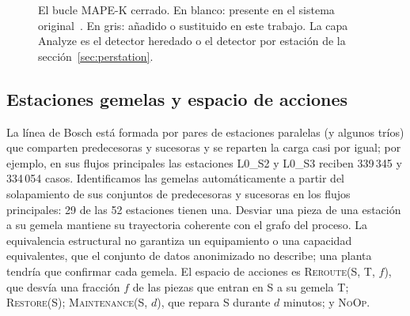 \documentclass[preprint,11pt]{elsarticle}
\begin{document}
\begin{figure}[t]
\centering
{}
\caption{El bucle MAPE-K cerrado. En blanco: presente en el sistema original~\cite{sanchez2020selfstar}. En gris: añadido o sustituido en este trabajo. La capa Analyze es el detector heredado o el detector por estación de la sección~\ref{sec:perstation}.}
\label{fig:loop}
\end{figure}

\subsection{Estaciones gemelas y espacio de acciones}
La línea de Bosch está formada por pares de estaciones paralelas (y algunos tríos) que comparten predecesoras y sucesoras y se reparten la carga casi por igual; por ejemplo, en sus flujos principales las estaciones L0\_S2 y L0\_S3 reciben 339\,345 y 334\,054 casos. Identificamos las gemelas automáticamente a partir del solapamiento de sus conjuntos de predecesoras y sucesoras en los flujos principales: 29 de las 52 estaciones tienen una. Desviar una pieza de una estación a su gemela mantiene su trayectoria coherente con el grafo del proceso. La equivalencia estructural no garantiza un equipamiento o una capacidad equivalentes, que el conjunto de datos anonimizado no describe; una planta tendría que confirmar cada gemela. El espacio de acciones es \textsc{Reroute}(S, T, $f$), que desvía una fracción $f$ de las piezas que entran en S a su gemela T; \textsc{Restore}(S); \textsc{Maintenance}(S, $d$), que repara S durante $d$ minutos; y \textsc{NoOp}.
\end{document}
